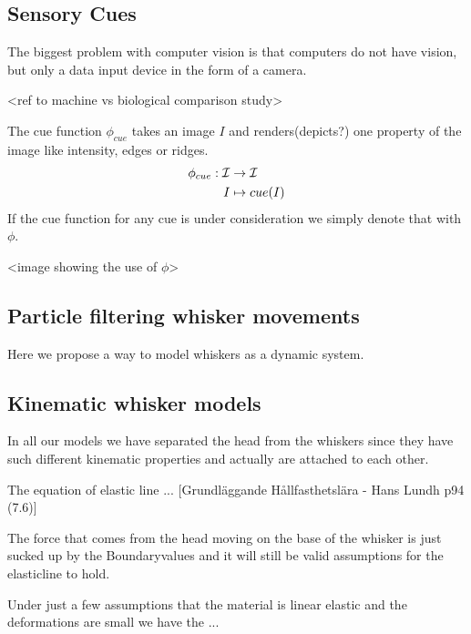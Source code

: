 \subsection{Sensory Cues}

The biggest problem with computer vision is that computers do not have
vision, but only a data input device in the form of a camera. 

<ref to machine vs biological comparison study>


\begin{definition}
    The cue function $\phi_{cue}$ takes an image $I$ and renders(depicts?) one property of the
    image like intensity, edges or ridges.
    \begin{equation}
        \begin{split}
            \phi_{cue} : \mathcal{I} &\rightarrow \mathcal{I}\\
                I &\mapsto cue(I)
        \end{split}
    \end{equation}
    If the cue function for any cue is under consideration we simply denote that with $\phi$.
\end{definition}


<image showing the use of $\phi$>


\subsection{Particle filtering whisker movements}
Here we propose a way to model whiskers as a dynamic system.

\subsection{Kinematic whisker models}

In all our models we have separated the head from the whiskers since they have
such different kinematic properties and actually are attached to each other.




The equation of elastic line ... [Grundläggande Hållfasthetslära - Hans Lundh
p94 (7.6)]

The force that comes from the head moving on the base of the whisker is just 
sucked up by the Boundaryvalues and it will still be valid assumptions for the
elasticline to hold.

Under just a few assumptions that the material is linear elastic and the
deformations are small we have the ...



